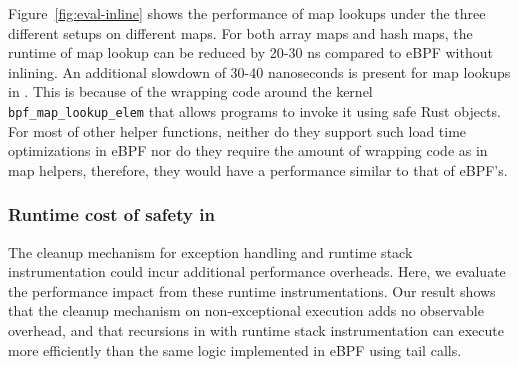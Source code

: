 Figure~\ref{fig:eval-inline} shows the performance of map lookups under the
    three different setups on different maps.
For both array maps and hash maps, the
    runtime of map lookup can be reduced by 20-30 ns compared to eBPF without
    inlining.
An additional slowdown of 30-40 nanoseconds is present for map lookups in
    \projname{}.
This is because of the wrapping code around the kernel
    \texttt{bpf\_map\_lookup\_elem} that allows \projname{} programs to invoke
    it using safe Rust objects.
For most of other helper functions, neither do they support such load time
    optimizations in eBPF nor do they require the amount of wrapping code as in
    map helpers, therefore, they would have a performance similar to that of
    eBPF's.




\subsubsection{Runtime cost of safety in \projname{}}
The cleanup mechanism for exception handling and runtime stack instrumentation
    could incur additional performance overheads.
Here, we evaluate the performance impact from these runtime instrumentations.
Our result shows that the cleanup mechanism on non-exceptional execution adds
    no observable overhead, and that recursions in \projname{} with runtime
    stack instrumentation can execute more efficiently than the same logic
    implemented in eBPF using tail calls.


